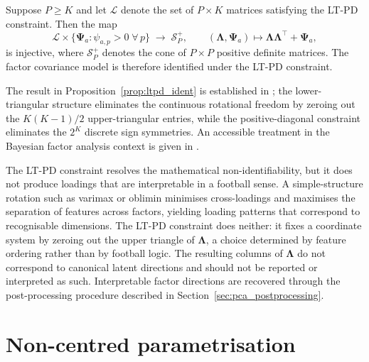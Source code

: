 \begin{proposition}
\label{prop:ltpd_ident}
Suppose $P \geq K$ and let $\mathcal{L}$ denote the set of $P \times K$ matrices satisfying the LT-PD constraint. Then the map
\[
\mathcal{L} \times \{\boldsymbol{\Psi}_a : \psi_{a,p} > 0\;\forall\, p\} \;\longrightarrow\; \mathcal{S}^+_P, \qquad (\boldsymbol{\Lambda},\boldsymbol{\Psi}_a) \mapsto \boldsymbol{\Lambda}\boldsymbol{\Lambda}^\top + \boldsymbol{\Psi}_a,
\]
is injective, where $\mathcal{S}^+_P$ denotes the cone of $P \times P$ positive definite matrices. The factor covariance model is therefore identified under the LT-PD constraint.
\end{proposition}

The result in Proposition~\ref{prop:ltpd_ident} is established in \cite{anderson1956statistical}; the lower-triangular structure eliminates the continuous rotational freedom by zeroing out the $K(K-1)/2$ upper-triangular entries, while the positive-diagonal constraint eliminates the $2^K$ discrete sign symmetries. An accessible treatment in the Bayesian factor analysis context is given in \cite{geweke1996measuring}.

\begin{remark}
\label{rem:ltpd_notinterp}
The LT-PD constraint resolves the mathematical non-identifiability, but it does not produce loadings that are interpretable in a football sense. A simple-structure rotation such as varimax or oblimin minimises cross-loadings and maximises the separation of features across factors, yielding loading patterns that correspond to recognisable dimensions. The LT-PD constraint does neither: it fixes a coordinate system by zeroing out the upper triangle of $\boldsymbol{\Lambda}$, a choice determined by feature ordering rather than by football logic. The resulting columns of $\boldsymbol{\Lambda}$ do not correspond to canonical latent directions and should not be reported or interpreted as such. Interpretable factor directions are recovered through the post-processing procedure described in Section~\ref{sec:pca_postprocessing}.
\end{remark}

\section{Non-centred parametrisation}
\label{sec:noncentred}

